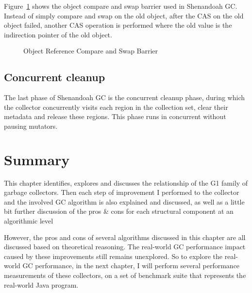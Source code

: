 Figure~\ref{fig:objectcasbarrier} shows the object compare and swap barrier used in Shenandoah GC.
Instead of simply compare and swap on the old object, after the CAS on the old object failed,
another CAS operation is performed where the old value is the indirection pointer of the old object.

\begin{figure}
  \centering
  
  \caption{Object Reference Compare and Swap Barrier} 
  \label{fig:objectcasbarrier}
\end{figure}

\subsection{Concurrent cleanup}

The last phase of Shenandoah GC is the concurrent cleanup phase, during which the
collector concurrently visits each region in the collection set, clear their metadata
and release these regions. This phase runs in concurrent without pausing mutators.



\section{Summary}

This chapter identifies, explores and discusses the relationship of the G1 family of garbage collectors.
Then each step of improvement I performed to the collector and the involved GC algorithm
is also explained and discussed, as well as a little bit further discussion of the
pros \& cons for each structural component at an algorithmic level

However, the pros and cons of several algorithms discussed in this chapter are
all discussed based on theoretical reasoning.
The real-world GC performance impact caused by these improvements still remains unexplored.
So to explore the real-world GC performance, in the next chapter, I will perform several performance
measurements of these collectors, on a set of benchmark suite that represents the
real-world Java program.


